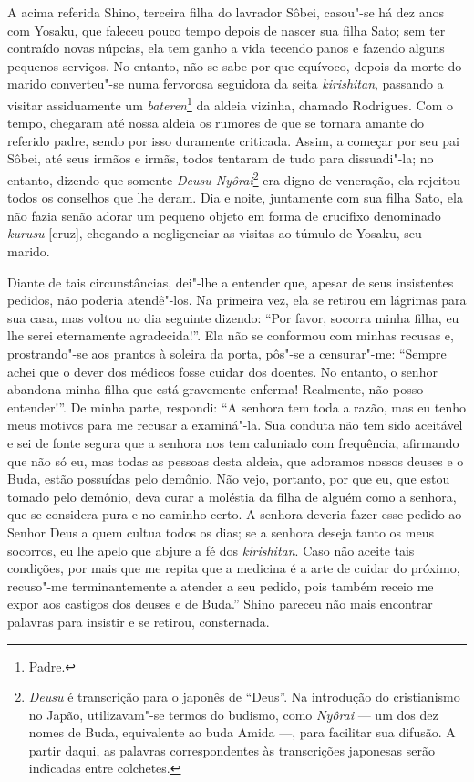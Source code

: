 A acima referida Shino, terceira filha do lavrador Sôbei, casou"-se há
dez anos com Yosaku, que faleceu pouco tempo depois de nascer sua filha
Sato; sem ter contraído novas núpcias, ela tem ganho a vida tecendo
panos e fazendo alguns pequenos serviços. No entanto, não se sabe por
que equívoco, depois da morte do marido converteu"-se numa fervorosa
seguidora da seita \textit{kirishitan}, passando a visitar assiduamente
um \textit{bateren}\footnote{Padre.} da aldeia
vizinha, chamado Rodrigues. Com o tempo, chegaram até nossa aldeia os
rumores de que se tornara amante do referido padre, sendo por isso
duramente criticada. Assim, a começar por seu pai Sôbei, até seus
irmãos e irmãs, todos tentaram de tudo para dissuadi"-la; no entanto,
dizendo que somente \textit{Deusu Nyôrai}\footnote{\textit{Deusu} é transcrição para o japonês de ``Deus''. Na
introdução do cristianismo no Japão, utilizavam"-se termos do budismo,
como \textit{Nyôrai} --- um dos dez nomes de Buda, equivalente ao buda
Amida ---, para facilitar sua difusão. A partir daqui, as palavras 
correspondentes às transcrições japonesas serão indicadas entre colchetes.} 
era digno de veneração,
ela rejeitou todos os conselhos que lhe deram. Dia e noite, juntamente
com sua filha Sato, ela não fazia senão adorar um pequeno objeto em
forma de crucifixo denominado \textit{kurusu} [cruz], 
chegando a negligenciar as visitas ao túmulo de Yosaku, seu marido.

Diante de tais circunstâncias, dei"-lhe a entender que, apesar de seus
insistentes pedidos, não poderia atendê"-los. Na primeira vez, ela se
retirou em lágrimas para sua casa, mas voltou no dia seguinte dizendo:
``Por favor, socorra minha filha, eu lhe serei eternamente agradecida!''. 
Ela não se conformou com minhas recusas e, prostrando"-se aos prantos à
soleira da porta, pôs"-se a censurar"-me: ``Sempre achei que o dever dos
médicos fosse cuidar dos doentes. No entanto, o senhor abandona minha
filha que está gravemente enferma! Realmente, não posso entender!''. De
minha parte, respondi: ``A senhora tem toda a razão, mas eu tenho meus
motivos para me recusar a examiná"-la. Sua conduta não tem sido
aceitável e sei de fonte segura que a senhora nos tem caluniado com
frequência, afirmando que não só eu, mas todas as pessoas desta aldeia,
que adoramos nossos deuses e o Buda, estão possuídas pelo demônio. Não
vejo, portanto, por que eu, que estou tomado pelo demônio, deva curar a
moléstia da filha de alguém como a senhora, que se considera pura e no
caminho certo. A senhora deveria fazer esse pedido ao Senhor Deus a
quem cultua todos os dias; se a senhora deseja tanto os meus socorros,
eu lhe apelo que abjure a fé dos \textit{kirishitan}. Caso não aceite
tais condições, por mais que me repita que a medicina é a arte de
cuidar do próximo, recuso"-me terminantemente a atender a seu pedido,
pois também receio me expor aos castigos dos deuses e de Buda.'' Shino
pareceu não mais encontrar palavras para insistir e se retirou, consternada.

